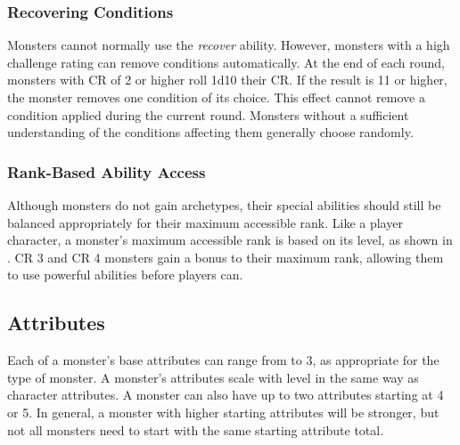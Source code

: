         \subsubsection{Recovering Conditions}
            Monsters cannot normally use the \textit{recover} ability.
            However, monsters with a high challenge rating can remove conditions automatically.
            At the end of each round, monsters with CR of 2 or higher roll 1d10 \add their CR.
            If the result is 11 or higher, the monster removes one condition of its choice.
            This effect cannot remove a condition applied during the current round.
            Monsters without a sufficient understanding of the conditions affecting them generally choose randomly.

        \subsubsection{Rank-Based Ability Access}
            Although monsters do not gain archetypes, their special abilities should still be balanced appropriately for their maximum accessible rank.
            Like a player character, a monster's maximum accessible rank is based on its level, as shown in .
            CR 3 and CR 4 monsters gain a  bonus to their maximum rank, allowing them to use powerful abilities before players can.

    \subsection{Attributes}
        Each of a monster's base attributes can range from  to 3, as appropriate for the type of monster.
        A monster's attributes scale with level in the same way as character attributes.
        A monster can also have up to two attributes starting at 4 or 5.
        In general, a monster with higher starting attributes will be stronger, but not all monsters need to start with the same starting attribute total.

